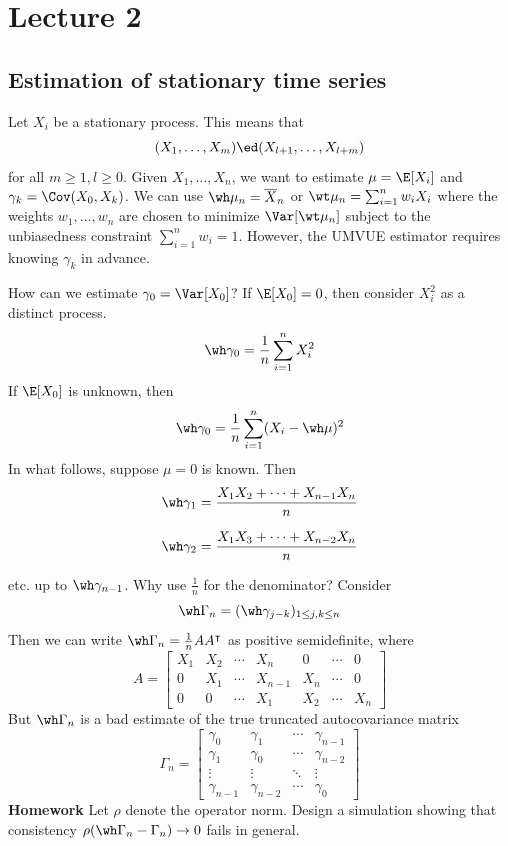 \section{Lecture 2}

\subsection*{Estimation of stationary time series}
Let \(X_i\) be a stationary process. This means that
\[(X_1, \dots, X_m) \ed (X_{l + 1}, \dots, X_{l + m})\]
for all \(m \geq 1, l \geq 0\). Given \(X_1, \dots, X_n\), we want to estimate \(\mu = \E[X_i]\) and \(\gamma_k = \Cov(X_0, X_k)\). We can use \(\wh \mu_n = \overline X_n\) or \(\wt \mu_n = \sum_{i=1}^n w_i X_i\) where the weights \(w_1, \dots, w_n\) are chosen to minimize \(\Var[\wt \mu_n]\) subject to the unbiasedness constraint \(\sum_{i=1}^n w_i = 1\). However, the UMVUE estimator requires knowing \(\gamma_k\) in advance.

How can we estimate \(\gamma_0 = \Var[X_0]\)? If \(\E[X_0] = 0\), then consider \(X_i^2\) as a distinct process.
\[\wh \gamma_0 = \frac{1}{n}\sum_{i=1}^n X_i^2\]
If \(\E[X_0]\) is unknown, then
\[\wh \gamma_0 = \frac{1}{n}\sum_{i=1}^n (X_i - \wh \mu)^2\]
In what follows, suppose \(\mu = 0\) is known. Then
\[\wh \gamma_1 = \frac{X_1X_2 + \cdots + X_{n-1}X_n}{n}\]

\[\wh \gamma_2 = \frac{X_1X_3 + \cdots + X_{n-2}X_n}{n}\]

etc. up to \(\wh \gamma_{n-1}\). Why use \(\frac{1}{n}\) for the denominator? Consider
\[\wh \Gamma_n = (\wh \gamma_{j-k})_{1 \leq j, k \leq n}\]
Then we can write \(\wh \Gamma_n = \frac{1}{n}AA^\intercal\) as positive semidefinite, where
\[A = 
\begin{bmatrix}
X_1 & X_2 & \cdots & X_n & 0 & \cdots & 0 \\
0 & X_1 & \cdots & X_{n-1} & X_n & \cdots & 0 \\
0 & 0 & \cdots & X_1 & X_2 & \cdots & X_n
\end{bmatrix}\]
But \(\wh \Gamma_n\) is a bad estimate of the true truncated autocovariance matrix
\[\Gamma_n =
\begin{bmatrix}
\gamma_0 & \gamma_1 & \cdots & \gamma_{n-1} \\
\gamma_1 & \gamma_0 & \cdots & \gamma_{n-2} \\
\vdots & \vdots & \ddots & \vdots \\
\gamma_{n-1} & \gamma_{n-2} & \cdots & \gamma_0
\end{bmatrix}\]
\textbf{Homework} Let \(\rho\) denote the operator norm. Design a simulation showing that consistency \(\rho(\wh \Gamma_n - \Gamma_n) \to 0\) fails in general.

